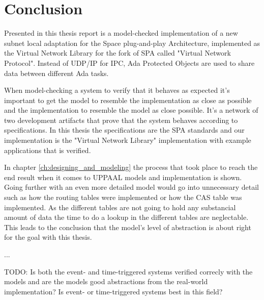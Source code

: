 \chapter{Conclusion}\label{ch:conclusion}
Presented in this thesis report is a model-checked implementation of a new
subnet local adaptation for the Space plug-and-play Architecture, implemented
as the Virtual Network Library \cite{web:github-vn-lib} for the fork of SPA
called "Virtual Network Protocol". Instead of UDP/IP for IPC, Ada Protected
Objects are used to share data between different Ada tasks.

When model-checking a system to verify that it behaves as expected it's
important to get the model to resemble the implementation as close as possible
and the implementation to resemble the model as close possible. It's a network
of two development artifacts that prove that the system behaves according to
specifications. In this thesis the specifications are the SPA standards
and our implementation is the "Virtual Network Library" implementation with
example applications that is verified.

In chapter \ref{ch:designing_and_modeling} the process that took place to reach
the end result when it comes to UPPAAL models and implementation is shown.
Going further with an even more detailed model would go into unnecessary detail
such as how the routing tables were implemented or how the CAS table was
implemented. As the different tables are not going to hold any substancial
amount of data the time to do a lookup in the different tables are
neglectable. This leads to the conclusion that the model's level of abstraction
is about right for the goal with this thesis.

...

TODO: Is both the event- and time-triggered systems verified correcly with the
models and are the models good abstractions from the real-world implementation?
Is event- or time-triggered systems best in this field?

